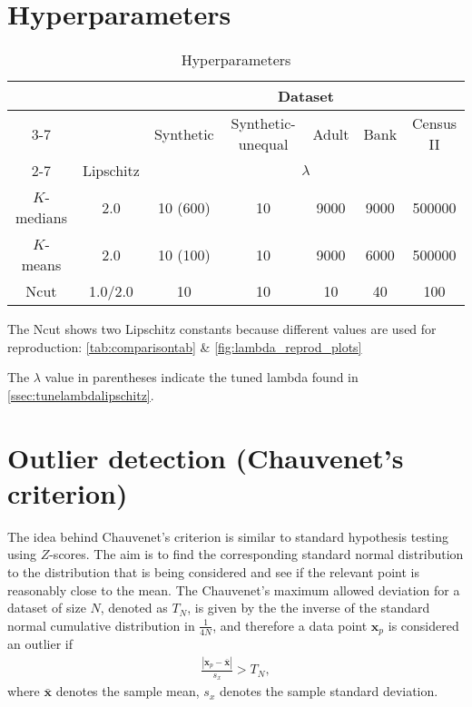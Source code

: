 \section{Hyperparameters}\label{appendix:hyperparams}
\begin{table}[H]
	\small
	\centering
	\begin{tabular}{|c|c|ccccc|}    \hline
	\multirow{4}{*}{}   & \multirow{2}{*}{} & \multicolumn{5}{c|}{Dataset} \\ \cline{3-7}
						&                   & Synthetic & Synthetic-unequal & Adult & Bank  & Census II \\ \cline{2-7}
						& Lipschitz         & \multicolumn{5}{c|}{$\lambda$}                            \\ \hline
	$K$-medians         & 2.0               & 10 (600)  & 10                & 9000  & 9000  & 500000    \\ \hline
	$K$-means           & 2.0               & 10 (100)  & 10                & 9000  & 6000  & 500000    \\ \hline
	Ncut                & 1.0/2.0           & 10        & 10                & 10    & 40    & 100       \\ \hline
	\end{tabular}
	
	\begin{tablenotes}
		\small
		\item The Ncut shows two Lipschitz constants because different values are used for reproduction: \autoref{tab:comparisontab} \& \autoref{fig:lambda_reprod_plots}
		\item The $\lambda$ value in parentheses indicate the tuned lambda found in \autoref{ssec:tunelambdalipschitz}. 
	\end{tablenotes}
	\caption{Hyperparameters}
	\label{tab:hyperparamreprod}
\end{table}



\section{Outlier detection (Chauvenet's criterion)}
\label{sec:outlierdet}

The idea behind Chauvenet's criterion is similar to standard hypothesis testing using $Z$-scores. The aim is to find the corresponding standard normal distribution to the distribution that is being considered and see if the relevant point is reasonably close to the mean. The Chauvenet's maximum allowed deviation for a dataset of size $N$, denoted as $T_N$, is given by the the inverse of the standard normal cumulative distribution in $\frac{1}{4N}$, and therefore a data point $\textbf{x}_p$ is considered an outlier if
\begin{align*}
	\frac{|\textbf{x}_p - \bar{\textbf{x}}|}{s_x} > T_N,  
\end{align*}
where $\bar{\textbf{x}}$ denotes the sample mean, $s_x$ denotes the sample standard deviation.






